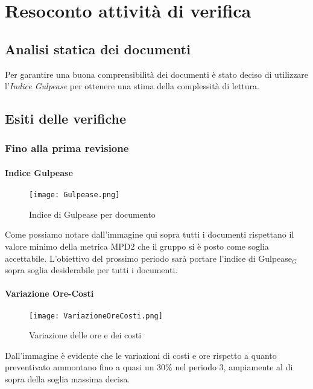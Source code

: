 \chapter{Resoconto attività di verifica}
\section{Analisi statica dei documenti}
Per garantire una buona comprensibilità dei documenti è stato deciso di utilizzare l'\textit{Indice Gulpease} per ottenere una stima della complessità di lettura.
\section{Esiti delle verifiche}
    \subsection{Fino alla prima revisione}
      \subsubsection{Indice Gulpease}  
        \begin{figure}[h!]
            \centering
            \texttt{[image: Gulpease.png]}
            \caption{Indice di Gulpease per documento}
        \end{figure}
        Come possiamo notare dall'immagine qui sopra tutti i documenti rispettano il valore minimo della metrica MPD2 che il gruppo si è posto come soglia accettabile. L'obiettivo del prossimo periodo sarà portare l'indice di Gulpease$_G$ sopra soglia desiderabile per tutti i documenti. 
      \subsubsection{Variazione Ore-Costi}  
        \begin{figure}[h!]
            \centering
            \texttt{[image: VariazioneOreCosti.png]}
            \caption{Variazione delle ore e dei costi}
        \end{figure}
        Dall'immagine è evidente che le variazioni di costi e ore rispetto a quanto preventivato ammontano fino a quasi un 30\% nel periodo 3, ampiamente al di sopra della soglia massima decisa.
